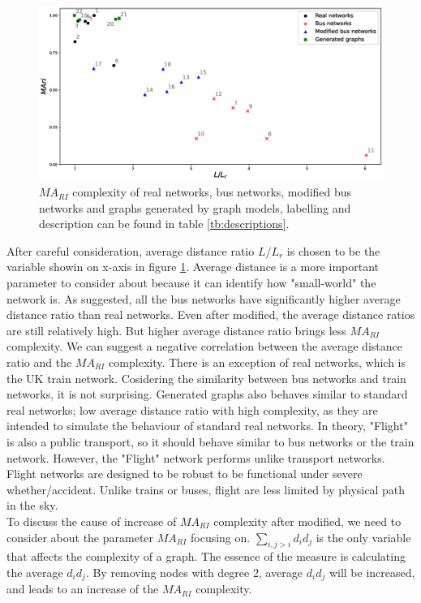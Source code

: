 \documentclass[12pt]{article}
\begin{document}
{\begin{figure}[ht]
    \includegraphics[width = \textwidth]{real_networks.eps}
    \caption{$MA_{RI}$ complexity of real networks, bus networks, modified bus networks and graphs generated by graph models, labelling and description can be found in table \ref{tb:descriptions}.}
    \label{fig:real_networks}
\end{figure}
\noindent
After careful consideration, average distance ratio $L/L_r$ is chosen to be the variable showin on x-axis in figure \ref{fig:real_networks}. Average distance is a more important parameter to consider about because it can identify how "small-world" the network is. As suggested, all the bus networks have significantly higher average distance ratio than real networks. Even after modified, the average distance ratios are still relatively high. But higher average distance ratio brings less $MA_{RI}$ complexity. We can suggest a negative correlation between the average distance ratio and the $MA_{RI}$ complexity. There is an exception of real networks, which is the UK train network. Cosidering the similarity between bus networks and train networks, it is not surprising. Generated graphs also behaves similar to standard real networks; low average distance ratio with high complexity, as they are intended to simulate the behaviour of standard real networks. In theory, "Flight" is also a public transport, so it should behave similar to bus networks or the train network. However, the "Flight" network performs unlike transport networks. Flight networks are designed to be robust\cite{zhixing2021recent} to be functional under severe whether/accident. Unlike trains or buses, flight are less limited by physical path in the sky.\\
To discuss the cause of increase of $MA_{RI}$ complexity after modified, we need to consider about the parameter $MA_{RI}$ focusing on. $\sum_{i,j>i}d_id_j$ is the only variable that affects the complexity of a graph. The essence of the measure is calculating the average $d_id_j$. By removing nodes with degree 2, average $d_id_j$ will be increased, and leads to an increase of the $MA_{RI}$ complexity.

}
\end{document}
